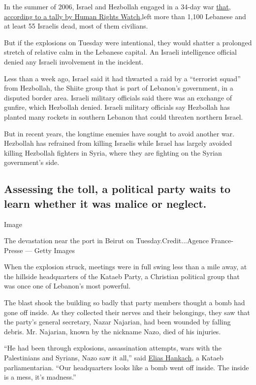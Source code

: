 In the summer of 2006, Israel and Hezbollah engaged in a 34-day war
\href{https://www.hrw.org/report/2007/09/05/why-they-died/civilian-casualties-lebanon-during-2006-war\#}{that,
according to a tally by Human Rights Watch,}left more than 1,100
Lebanese and at least 55 Israelis dead, most of them civilians.

But if the explosions on Tuesday were intentional, they would shatter a
prolonged stretch of relative calm in the Lebanese capital. An Israeli
intelligence official denied any Israeli involvement in the incident.

Less than a week ago, Israel said it had thwarted a raid by a
``terrorist squad'' from Hezbollah, the Shiite group that is part of
Lebanon's government, in a disputed border area. Israeli military
officials said there was an exchange of gunfire, which Hezbollah denied.
Israeli military officials say Hezbollah has planted many rockets in
southern Lebanon that could threaten northern Israel.

But in recent years, the longtime enemies have sought to avoid another
war. Hezbollah has refrained from killing Israelis while Israel has
largely avoided killing Hezbollah fighters in Syria, where they are
fighting on the Syrian government's side.

\hypertarget{assessing-the-toll-a-political-party-waits-to-learn-whether-it-was-malice-or-neglect}{%
\subsection{Assessing the toll, a political party waits to learn whether
it was malice or
neglect.}\label{assessing-the-toll-a-political-party-waits-to-learn-whether-it-was-malice-or-neglect}}

Image

The devastation near the port in Beirut on Tuesday.Credit...Agence
France-Presse --- Getty Images

When the explosion struck, meetings were in full swing less than a mile
away, at the hillside headquarters of the Kataeb Party, a Christian
political group that was once one of Lebanon's most powerful.

The blast shook the building so badly that party members thought a bomb
had gone off inside. As they collected their nerves and their
belongings, they saw that the party's general secretary, Nazar Najarian,
had been wounded by falling debris. Mr. Najarian, known by the nickname
Nazo, died of his injuries.

``He had been through explosions, assassination attempts, wars with the
Palestinians and Syrians, Nazo saw it all,'' said
\href{https://www.facebookcorewwwi.onion/EliasHankach2018/}{Elias
Hankach}, a Kataeb parliamentarian. ``Our headquarters looks like a bomb
went off inside. The inside is a mess, it's madness.''

